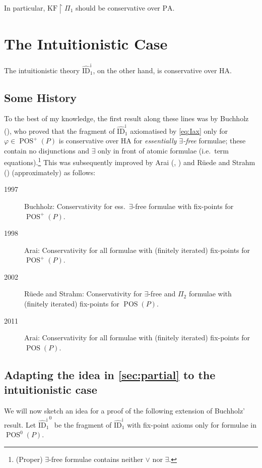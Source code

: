 \documentclass{scrartcl}
\theoremstyle{definition}
\theoremstyle{plain}
\theoremstyle{remark}
\renewcommand{\=}{=\!\!\!=}
\newcommand{\PA}{\ensuremath{\mathrm{PA}}}
\DeclareMathOperator{\POS}{POS}
\newcommand{\IID}[1]{\ensuremath{\widehat{\mathrm{ID}}_{#1}^{\mathrm{i}}{}}}
\newcommand{\HA}{\ensuremath{\mathrm{HA}}}
\newcommand{\KF}{\ensuremath{\mathrm{KF}}}
\begin{document}
In particular, $\KF \restriction \Pi_1$ should be conservative over $\PA$.

\section{The Intuitionistic Case}
\label{sec:int}

The intuitionistic theory $\IID1$, on the other hand, is conservative over $\HA$.

\subsection{Some History}
\label{sec:hist}

To the best of my knowledge, the first result along these lines was by Buchholz (\cite{Buchholz:1997}), who proved that the fragment of $\IID1$ axiomatised by \eqref{eq:Iax} only for $\varphi \in \POS^+(P)$ is conservative over $\HA$ for \emph{essentially $\exists$-free} formulae; these contain no disjunctions and $\exists$ only in front of atomic formulae (i.e.~term equations).\footnote{(Proper) $\exists$-free formulae contains neither $\lor$ nor $\exists$.} This was subsequently improved by Arai (\cite{Arai:1998}, \cite{Arai:2011}) and Rüede and Strahm (\cite{Ruede_Strahm:2002}) (approximately) as follows:

\begin{description}
\item[1997] Buchholz: Conservativity for ess.~$\exists$-free formulae with fix-points for $\POS^+(P)$.
\item[1998] Arai: Conservativity for all formulae with (finitely iterated) fix-points for $\POS^+(P)$.
\item[2002] Rüede and Strahm: Conservativity for $\exists$-free and $\Pi_2$ formulae with (finitely iterated) fix-points for $\POS(P)$.
\item[2011] Arai: Conservativity for all formulae with (finitely iterated) fix-points for $\POS(P)$.
\end{description}

\subsection{Adapting the idea in \ref{sec:partial} to the intuitionistic case}
\label{sec:main}

We will now sketch an idea for a proof of the following extension of Buchholz' result. Let $\IID1^0$ be the fragment of $\IID1$ with fix-point axioms only for formulae in $\POS^0(P)$.
\end{document}

